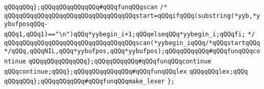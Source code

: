 \verb|qQQqqQQq};qQQqqQQqqQQqqQQq#qQQqfunqQQqscan|\newline
\verb|/*|\newline
\verb|qQQqqQQqqQQqqQQqqQQqqQQqqQQqqQQqqQQqstart=qQQqifqQQq(substring(*yyb,*yybufposqQQq-qQQq1,qQQq1)=="\n")qQQq*yybegin_i+1;qQQqelseqQQq*yybegin_i;qQQqfi;|\newline
\verb|*/|\newline
\verb|qQQqqQQqqQQqqQQqqQQqqQQqqQQqqQQqqQQqscan(*yybegin_iqQQq/*qQQqstartqQQq*/qQQq,qQQqNIL,qQQq*yybufpos,qQQq*yybufpos);qQQqqQQqqQQq#qQQqfunqQQqcontinue|\newline
\verb|qQQqqQQqqQQqqQQq};qQQqqQQqqQQq#qQQqfunqQQqcontinue|\newline
\verb|qQQqcontinue;qQQq};qQQqqQQqqQQqqQQq#qQQqfunqQQqlex|\newline
\verb|qQQqqQQqlex;qQQq|\newline
\verb|qQQqqQQq};qQQqqQQqqQQq#qQQqfunqQQqmake_lexer|\newline
\verb|};|\newline

